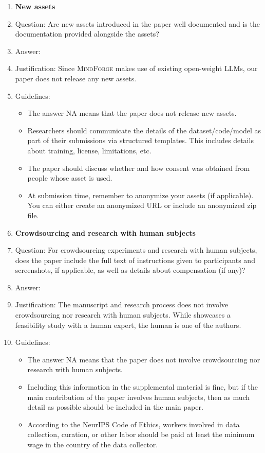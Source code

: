 \documentclass{article}
\newcommand{\collabvoyager}[0]{\mbox{\textsc{MindForge}}\xspace}
\begin{document}
\begin{enumerate}
\item {\bf New assets}
    \item[] Question: Are new assets introduced in the paper well documented and is the documentation provided alongside the assets?
    \item[] Answer: \answerNA{} %
    \item[] Justification: Since \collabvoyager makes use of existing open-weight LLMs, our paper does not release any new assets.
    \item[] Guidelines:
    \begin{itemize}
        \item The answer NA means that the paper does not release new assets.
        \item Researchers should communicate the details of the dataset/code/model as part of their submissions via structured templates. This includes details about training, license, limitations, etc. 
        \item The paper should discuss whether and how consent was obtained from people whose asset is used.
        \item At submission time, remember to anonymize your assets (if applicable). You can either create an anonymized URL or include an anonymized zip file.
    \end{itemize}

\item {\bf Crowdsourcing and research with human subjects}
    \item[] Question: For crowdsourcing experiments and research with human subjects, does the paper include the full text of instructions given to participants and screenshots, if applicable, as well as details about compensation (if any)? 
    \item[] Answer: \answerNA{} %
    \item[] Justification: The manuscript and research process does not involve crowdsourcing nor research with human subjects. While  showcases a feasibility study with a human expert, the human is one of the authors.
    \item[] Guidelines:
    \begin{itemize}
        \item The answer NA means that the paper does not involve crowdsourcing nor research with human subjects.
        \item Including this information in the supplemental material is fine, but if the main contribution of the paper involves human subjects, then as much detail as possible should be included in the main paper. 
        \item According to the NeurIPS Code of Ethics, workers involved in data collection, curation, or other labor should be paid at least the minimum wage in the country of the data collector. 
    \end{itemize}


\end{enumerate}
\end{document}
